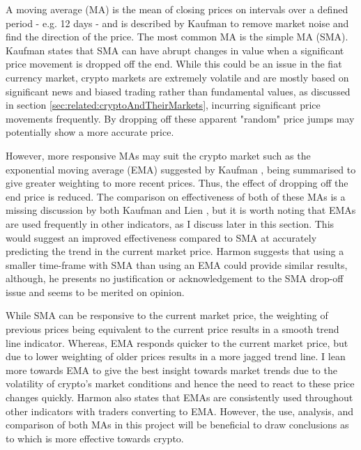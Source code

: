 A moving average (MA) is the mean of closing prices on intervals over a defined period - e.g. 12 days - and is described by Kaufman \cite{BOOK:Kaufman:2013} to remove market noise and find the direction of the price. The most common MA is the simple MA (SMA). Kaufman \cite{BOOK:Kaufman:2013} states that SMA can have abrupt changes in value when a significant price movement is dropped off the end. While this could be an issue in the fiat currency market, crypto markets are extremely volatile and are mostly based on significant news and biased trading rather than fundamental values, as discussed in section \ref{sec:related:cryptoAndTheirMarkets}, incurring significant price movements frequently. By dropping off these apparent "random" price jumps may potentially show a more accurate price. 

However, more responsive MAs may suit the crypto market such as the exponential moving average (EMA) suggested by Kaufman \cite{BOOK:Kaufman:2013}, being summarised to give greater weighting to more recent prices. Thus, the effect of dropping off the end price is reduced. The comparison on effectiveness of both of these MAs is a missing discussion by both Kaufman \cite{BOOK:Kaufman:2013} and Lien \cite{BOOK:Lien:2016}, but it is worth noting that EMAs are used frequently in other indicators, as I discuss later in this section. This would suggest an improved effectiveness compared to SMA at accurately predicting the trend in the current market price. Harmon \cite{BOOK:Harmon:2014} suggests that using a smaller time-frame with SMA than using an EMA could provide similar results, although, he presents no justification or acknowledgement to the SMA drop-off issue and seems to be merited on opinion. 
    
While SMA can be responsive to the current market price, the weighting of previous prices being equivalent to the current price results in a smooth trend line indicator. Whereas, EMA responds quicker to the current market price, but due to lower weighting of older prices results in a more jagged trend line. I lean more towards EMA to give the best insight towards market trends due to the volatility of crypto's market conditions and hence the need to react to these price changes quickly. Harmon \cite{BOOK:Harmon:2014} also states that EMAs are consistently used throughout other indicators with traders converting to EMA. However, the use, analysis, and comparison of both MAs in this project will be beneficial to draw conclusions as to which is more effective towards crypto.

